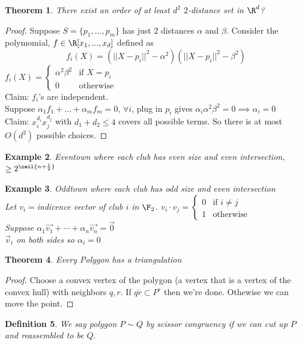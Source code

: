 \documentclass[a4paper]{article}
\newtheorem{thm}{Theorem}[section]
\newtheorem{defn}[thm]{Definition}
\newtheorem{eg}[thm]{Example}
\begin{document}
\begin{thm}
    There exist an order of at least $d^2$ $2$-distance set in $\R^d$?
\end{thm}
\begin{proof}
    Suppose $S=\{p_1,...,p_m\}$ has just $2$ distances $\alpha$ and $\beta.$
Consider the polymomial, $f\in \R[x_1,...,x_d]$ defined as $$f_i(X)=(||X-p_i||^2-\alpha^2)(||X-p_i||^2-\beta^2)$$
$f_i(X)=\begin{cases}
    \alpha^2\beta^2 & \text{if } X=p_i\\
    0 & \text{otherwise}
\end{cases}$\\
Claim: $f_i$'s are independent. \\
Suppose $\alpha_1f_1+...+\alpha_mf_m=0$, $\forall i$, plug in $p_i$ gives $\alpha_i \alpha^2\beta^2=0\implies \alpha_i=0$\\
Claim: $x_i^{d_i}x_j^{d_j}$ with $d_1+d_2\leq 4$ covers all possible terms. So there is at most $O(d^2)$ possible choices. 
\end{proof}
\begin{eg}
    Eventown where each club has even size and even intersection, $\geq 2^{\ceil{n+\frac{1}{2}}}$
\end{eg}
\begin{eg}
    Oddtown where each club has odd size and even intersection\\
    Let $v_i=$indicence vector of club $i$ in $\F_2$. $v_i\cdot v_j=\begin{cases}
        0 & \text{if } i\neq j \\ 1 & \text{otherwise}
    \end{cases}$\\
    Suppose $\alpha_1\Vec{v_1}+\cdots+\alpha_n\Vec{v_n}=\Vec{0}$\\
    $\Vec{v}_i$ on both sides so $\alpha_i=0$
\end{eg}
\begin{thm}
    Every Polygon has a triangulation
\end{thm}
\begin{proof}
    Choose a convex vertex of the polygon (a vertex that is a vertex of the convex hull) with neighbors $q,r$. If $\overline{qr}\subset P^\circ$ then we're done. Othewise we can move the point.
\end{proof}
\begin{defn}
    We say polygon $P\sim Q$ by scissor congruency if we can cut up $P$ and reassembled to be $Q.$
\end{defn}
\end{document}
